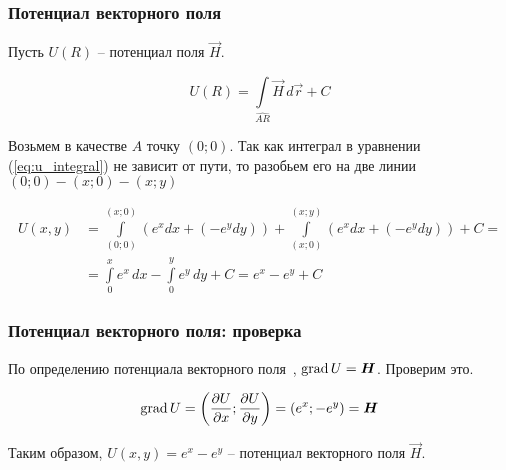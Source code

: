 \begin{frame}\frametitle{Потенциал векторного поля}
	Пусть \(U(R)\) -- потенциал поля \(\vec H\).

	\begin{equation*}
		U(R) =
		\int\limits_{\widehat{AR}} \vec H \, d \vec r + C
		\label{eq:u_integral}
	\end{equation*}

	Возьмем в качестве $A$ точку $(0; 0)$.
	Так как интеграл в уравнении (\ref{eq:u_integral}) не зависит от пути,
	то разобьем его на две линии $(0; 0) - (x; 0) - (x; y)$

	\begin{align*}
		U(x, y) & = \int\limits_{(0; 0)}^{(x; 0)} \left(e^x dx + (-e^y dy) \right) +
		\int\limits_{(x; 0)}^{(x; y)} \left(e^x dx + (-e^y dy) \right) + C =             \\
		        & =
		\int\limits_{0}^{x} e^x \, dx - \int\limits_{0}^{y} e^y \, dy + C =
		e^{x} - e^{y} + C
	\end{align*}

\end{frame}

\begin{frame}\frametitle{Потенциал векторного поля: проверка}
	По определению потенциала векторного поля~\cite[ст.~269]{zorich}, $\grad U = \vec H$. Проверим это.

	\begin{equation*}
		\grad U =
		\left( \frac{\partial U}{\partial x}; \frac{\partial U}{\partial y} \right) =
		\left( e^x; -e^y \right)
		= \vec H
	\end{equation*}

	Таким образом, \(U(x,y) = e^{x} - e^{y}\) -- потенциал векторного поля \(\vec H\).
\end{frame}
